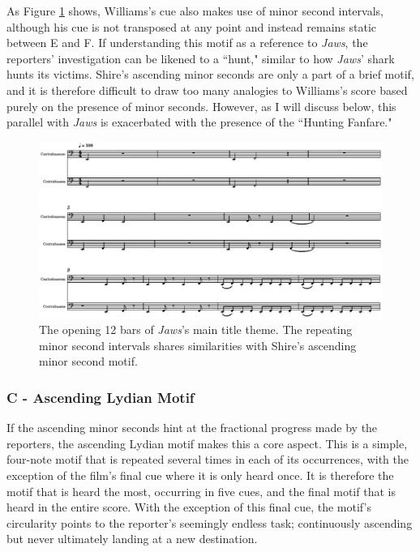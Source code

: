 As Figure \ref{fig:president-jaws-intro} shows, Williams's cue also makes use of minor second intervals, although his cue is not transposed at any point and instead remains static between E and F.
If understanding this motif as a reference to \textit{Jaws}, the reporters' investigation can be likened to a ``hunt," similar to how \textit{Jaws}' shark hunts its victims.
Shire's ascending minor seconds are only a part of a brief motif, and it is therefore difficult to draw too many analogies to Williams's score based purely on the presence of minor seconds.
However, as I will discuss below, this parallel with \textit{Jaws} is exacerbated with the presence of the ``Hunting Fanfare."
\begin{figure}
    \centering
    \includegraphics[width=1\linewidth]{img/president-jaws-intro.pdf}
    \caption{The opening 12 bars of \textit{Jaws}'s main title theme. The repeating minor second intervals shares similarities with Shire's ascending minor second motif.}
    \label{fig:president-jaws-intro}
\end{figure}

\subsubsection{C - Ascending Lydian Motif}

If the ascending minor seconds hint at the fractional progress made by the reporters, the ascending Lydian motif makes this a core aspect.
This is a simple, four-note motif that is repeated several times in each of its occurrences, with the exception of the film's final cue where it is only heard once.
It is therefore the motif that is heard the most, occurring in five cues, and the final motif that is heard in the entire score.
With the exception of this final cue, the motif's circularity points to the reporter's seemingly endless task; continuously ascending but never ultimately landing at a new destination.

